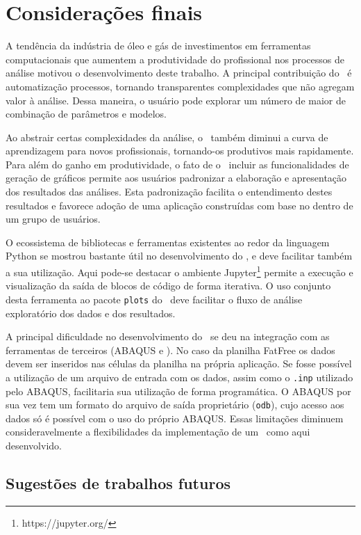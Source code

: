 \chapter{Considerações finais}\label{chap:conclusao}


A tendência da indústria de óleo e gás de investimentos em ferramentas computacionais que aumentem a produtividade do profissional nos processos de análise motivou o desenvolvimento deste trabalho. A principal contribuição do \frame\ é automatização processos, tornando transparentes complexidades que não agregam valor à análise. Dessa maneira, o usuário pode explorar um número de maior de combinação de parâmetros e modelos.

Ao abstrair certas complexidades da análise, o \frame\ também diminui a curva de aprendizagem para novos profissionais, tornando-os produtivos mais rapidamente.
Para além do ganho em produtividade, o fato de o \frame\ incluir as funcionalidades de geração de gráficos permite aos usuários padronizar a elaboração e apresentação dos resultados das análises. Esta padronização facilita o entendimento destes resultados e favorece adoção de uma aplicação construídas com base no \frame dentro de um grupo de usuários.

O ecossistema de bibliotecas e ferramentas existentes ao redor da linguagem Python se mostrou bastante útil no desenvolvimento do \frame, e deve facilitar também a sua utilização. Aqui pode-se destacar o ambiente Jupyter\footnote{https://jupyter.org/} permite a execução e visualização da saída de blocos de código de forma iterativa. O uso conjunto desta ferramenta ao pacote \texttt{plots} do \frame\ deve facilitar o fluxo de análise exploratório dos dados e dos resultados.

A principal dificuldade no desenvolvimento do \frame\ se deu na integração com as ferramentas de terceiros (ABAQUS e \fatfree). No caso da planilha FatFree os dados devem ser inseridos nas células da planilha na própria aplicação. Se fosse possível a utilização de um arquivo de entrada com os dados, assim como o \texttt{.inp} utilizado pelo ABAQUS, facilitaria sua utilização de forma programática. O ABAQUS por sua vez tem um formato do arquivo de saída proprietário (\texttt{odb}), cujo acesso aos dados só é possível com o uso do próprio ABAQUS. Essas limitações diminuem consideravelmente a flexibilidades da implementação de um \frame\ como aqui desenvolvido.


\section{Sugestões de trabalhos futuros}


